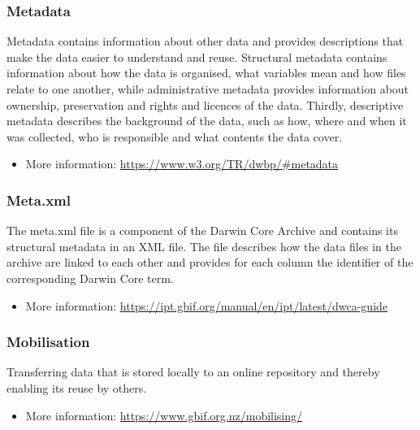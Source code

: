 \documentclass[
]{book}
\providecommand{\tightlist}{%
  \setlength{\itemsep}{0pt}\setlength{\parskip}{0pt}}
\begin{document}
\hypertarget{metadata}{%
\subsubsection*{Metadata}\label{metadata}}

Metadata contains information about other data and provides descriptions that make the data easier to understand and reuse. Structural metadata contains information about how the data is organised, what variables mean and how files relate to one another, while administrative metadata provides information about ownership, preservation and rights and licences of the data. Thirdly, descriptive metadata describes the background of the data, such as how, where and when it was collected, who is responsible and what contents the data cover.

\begin{itemize}
\tightlist
\item
  More information: \url{https://www.w3.org/TR/dwbp/\#metadata}
\end{itemize}

\hypertarget{metaxml}{%
\subsubsection*{Meta.xml}\label{metaxml}}

The meta.xml file is a component of the Darwin Core Archive and contains its structural metadata in an XML file. The file describes how the data files in the archive are linked to each other and provides for each column the identifier of the corresponding Darwin Core term.

\begin{itemize}
\tightlist
\item
  More information: \url{https://ipt.gbif.org/manual/en/ipt/latest/dwca-guide}
\end{itemize}

\hypertarget{mobilisation}{%
\subsubsection*{Mobilisation}\label{mobilisation}}

Transferring data that is stored locally to an online repository and thereby enabling its reuse by others.

\begin{itemize}
\tightlist
\item
  More information: \url{https://www.gbif.org.nz/mobilising/}
\end{itemize}
\end{document}
